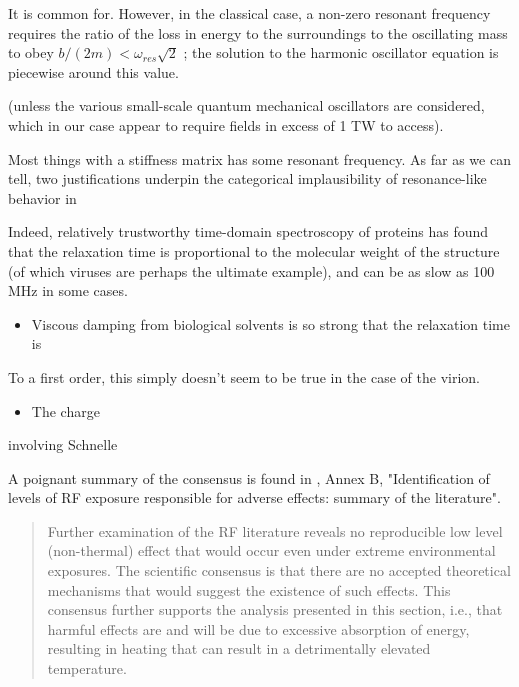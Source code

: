 \documentclass[paper.tex]{subfiles}
\begin{document}
\begin{multicols}{1}
It is common for.  However, in the classical case, a non-zero resonant frequency requires the ratio of the loss in energy to the surroundings to the oscillating mass to obey $b/(2m) < \omega_{res} \sqrt{2}$ \cite{Driven}; the solution to the harmonic oscillator equation is piecewise around this value. 

(unless the various small-scale quantum mechanical oscillators are considered, which in our case appear to require fields in excess of 1 TW to access).


Most things with a stiffness matrix has some resonant frequency\citationneeded. As far as we can tell, two justifications underpin the categorical implausibility of resonance-like behavior in 




Indeed, relatively trustworthy time-domain spectroscopy of proteins \cite{Microwave1994} has found that the relaxation time is proportional to the molecular weight of the structure (of which viruses are perhaps the ultimate example), and can be as slow as 100 MHz in some cases. 


\begin{itemize}
		\item Viscous damping from biological solvents is so strong that the relaxation time is 
\end{itemize}

To a first order, this simply doesn't seem to be true in the case of the virion.





\begin{itemize}
		\item The charge 
\end{itemize}




involving Schnelle 



A poignant summary of the consensus is found in \cite{IEEE2006}, Annex B, "Identification of levels of RF exposure responsible for adverse effects: summary of the literature".

\begin{quote}
	Further examination of the RF literature reveals no reproducible low level (non-thermal) effect that would
	occur even under extreme environmental exposures. The scientific consensus is that there are no accepted
	theoretical mechanisms that would suggest the existence of such effects. This consensus further supports the
	analysis presented in this section, i.e., that harmful effects are and will be due to excessive absorption of
	energy, resulting in heating that can result in a detrimentally elevated temperature. 
	

\end{quote}
\end{multicols}
\end{document}

